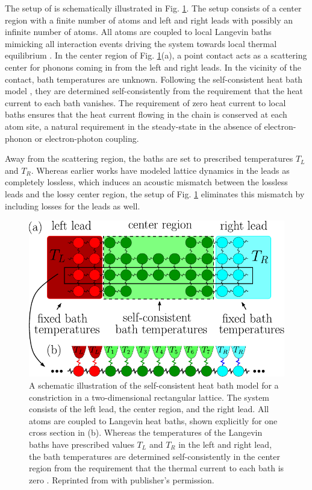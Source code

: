 The setup of  is schematically illustrated in Fig. \ref{fig:schb_setup}. The setup consists of a center region with a finite number of atoms and left and right leads with possibly an infinite number of atoms. All atoms are coupled to local Langevin baths mimicking all interaction events driving the system towards local thermal equilibrium \cite{bolsterli70}. In the center region of Fig. \ref{fig:schb_setup}(a), a point contact acts as a scattering center for phonons coming in from the left and right leads. In the vicinity of the contact, bath temperatures are unknown. Following the self-consistent heat bath model \cite{bolsterli70}, they are determined self-consistently from the requirement that the heat current to each bath vanishes. The requirement of zero heat current to local baths ensures that the heat current flowing in the chain is conserved at each atom site, a natural requirement in the steady-state in the absence of electron-phonon or electron-photon coupling.

Away from the scattering region, the baths are set to prescribed temperatures $T_L$ and $T_R$. Whereas earlier works \cite{dhar06} have modeled lattice dynamics in the leads as completely lossless, which induces an acoustic mismatch between the lossless leads and the lossy center region, the setup of Fig. \ref{fig:schb_setup} eliminates this mismatch by including losses for the leads as well.  

\begin{figure}
\begin{center}
 \includegraphics[width=.99\columnwidth]{pics/gf_fig1.pdf}
 \caption{A schematic illustration of the self-consistent heat bath model for a constriction in a two-dimensional rectangular lattice. The system consists of the left lead, the center region, and the right lead. All atoms are coupled to Langevin heat baths, shown explicitly for one cross section in (b). Whereas the temperatures of the Langevin baths have prescribed values $T_L$ and $T_R$ in the left and right lead, the bath temperatures are determined self-consistently in the center region from the requirement that the thermal current to each bath is zero \cite{bolsterli70}. Reprinted from  with publisher's permission.}
\label{fig:schb_setup}
\end{center}
\end{figure} 

